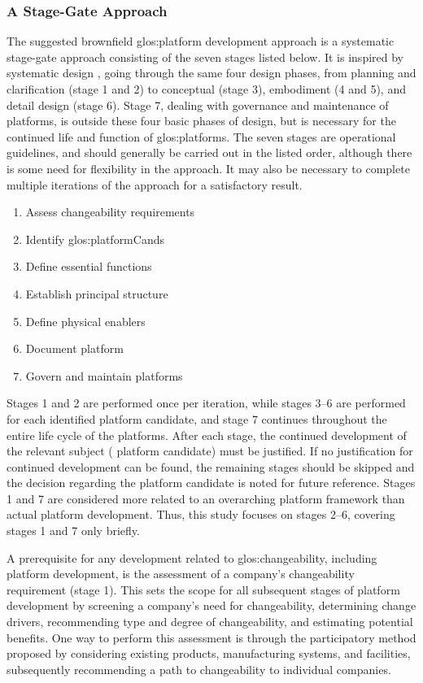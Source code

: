 \subsubsection*{A Stage-Gate Approach}
The suggested brownfield \gls{glos:platform} development approach is a systematic stage-gate approach consisting of the seven stages listed below.
It is inspired by systematic design \parencite{Pahl2007}, going through the same four design phases, from planning and clarification (stage 1 and 2) to conceptual (stage 3), embodiment (4 and 5), and detail design (stage 6).
Stage 7, dealing with governance and maintenance of platforms, is outside these four basic phases of design, but is necessary for the continued life and function of \gls{glos:platform}s.
The seven stages are operational guidelines, and should generally be carried out in the listed order, although there is some need for flexibility in the approach.
It may also be necessary to complete multiple iterations of the approach for a satisfactory result.
\begin{enumerate}
  \item Assess changeability requirements
  \item Identify \gls{glos:platformCand}s
  \item Define essential functions
  \item Establish principal structure
  \item Define physical enablers
  \item Document platform
  \item Govern and maintain platforms
\end{enumerate}
Stages 1 and 2 are performed once per iteration, while stages 3--6 are performed for each identified platform candidate, and stage 7 continues throughout the entire life cycle of the platforms.
After each stage, the continued development of the relevant subject (\ie{} platform candidate) must be justified.
If no justification for continued development can be found, the remaining stages should be skipped and the decision regarding the platform candidate is noted for future reference.
Stages 1 and 7 are considered more related to an overarching platform framework than actual platform development.
Thus, this study focuses on stages 2--6, covering stages 1 and 7 only briefly.

A prerequisite for any development related to \gls{glos:changeability}, including platform development, is the assessment of a company's changeability requirement (stage 1).
This sets the scope for all subsequent stages of platform development by screening a company's need for changeability, determining change drivers, recommending type and degree of changeability, and estimating potential benefits.
One way to perform this assessment is through the participatory method proposed by \textcite{doi:10.1080/00207543.2017.1394594} considering existing products, manufacturing systems, and facilities, subsequently recommending a path to changeability to individual companies.

